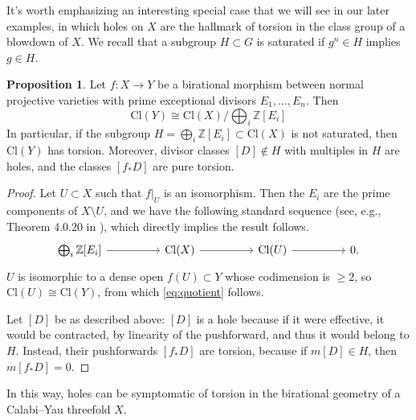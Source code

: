 \documentclass[11pt,dvipsnames]{article}
\theoremstyle{definition}
\newtheorem{prop}[theorem]{Proposition}
\begin{document}
It's worth emphasizing an interesting special case that we will see in our later examples, in which holes on $X$ are the hallmark of torsion in the class group of a blowdown of $X$. We recall that a subgroup $H \subset G$ is saturated if $g^n \in H$ implies $g \in H$.
\begin{prop}
    \label{prop:torsion}
    Let $f : X \rightarrow Y$ be a birational morphism between normal projective varieties with prime exceptional divisors $E_1, \dots, E_n$. Then
    \begin{equation}
        \label{eq:quotient}
        \mathrm{Cl}(Y) \cong \mathrm{Cl}(X) / \bigoplus_i \mathbb{Z} [E_i]
    \end{equation}
    In particular, if the subgroup $H = \bigoplus_i \mathbb{Z} [E_i] \subset \mathrm{Cl}(X)$ is not saturated, then $\mathrm{Cl}(Y)$ has torsion. Moreover, divisor classes $[D] \notin H$ with multiples in $H$ are holes, and the classes $[f_* D]$ are pure torsion.
\end{prop}
\begin{proof}
    Let $U \subset X$ such that $f|_U$ is an isomorphism. Then the $E_i$ are the prime components of $X \setminus U$, and we have the following standard sequence (see, e.g., Theorem 4.0.20 in \cite{cls}), which directly implies the result follows.
    \[\begin{tikzcd}
    	{\bigoplus_i \mathbb{Z} [E_i]} && {\mathrm{Cl}(X)} && {\mathrm{Cl}(U)} && 0.
    	\arrow[from=1-1, to=1-3]
    	\arrow[from=1-3, to=1-5]
    	\arrow[from=1-5, to=1-7]
    \end{tikzcd}\]
    $U$ is isomorphic to a dense open $f(U) \subset Y$ whose codimension is $\geq 2$, so $\mathrm{Cl}(U) \cong \mathrm{Cl}(Y)$, from which \cref{eq:quotient} follows.

    Let $[D]$ be as described above: $[D]$ is a hole because if it were effective, it would be contracted, by linearity of the pushforward, and thus it would belong to $H$. Instead, their pushforwards $[f_* D]$ are torsion, because if $m[D] \in H$, then $m[f_* D] = 0$.
\end{proof}
In this way, holes can be symptomatic of torsion in the birational geometry of a Calabi--Yau threefold $X$.
\end{document}
